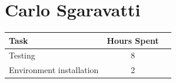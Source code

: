 \documentclass{Configuration_Files/PoliMi3i_thesis}
\begin{document}
\section{Carlo Sgaravatti}

\begin{table}[H]
    \centering 
    \begin{tabular}{|l|c|c|}
    \hline
    \rowcolor{bluepoli!40}
    \textbf{Task} & \textbf{Hours Spent}\T\B \\
    \hline
    Testing & 8\T\B \\
    \hline
    Environment installation & 2\T\B \\
    \hline
    \end{tabular}
\end{table}

\cleardoublepage
\end{document}
